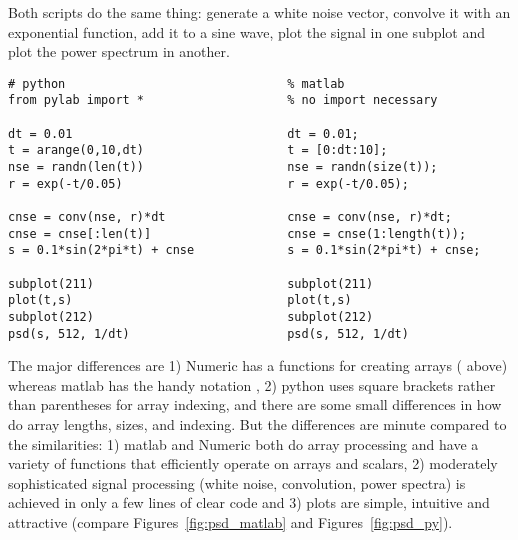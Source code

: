 \documentclass[twoside]{book}
\begin{document}

Both scripts do the same thing: generate a white noise vector,
convolve it with an exponential function, add it to a sine wave, plot
the signal in one subplot and plot the power spectrum in another.

\begin{lstlisting}[caption={matplotlib and matlab}, label=lst:versus_matlab]
# python                               % matlab
from pylab import *                    % no import necessary

dt = 0.01                              dt = 0.01;
t = arange(0,10,dt)                    t = [0:dt:10];
nse = randn(len(t))                    nse = randn(size(t));
r = exp(-t/0.05)                       r = exp(-t/0.05);

cnse = conv(nse, r)*dt                 cnse = conv(nse, r)*dt;
cnse = cnse[:len(t)]                   cnse = cnse(1:length(t));
s = 0.1*sin(2*pi*t) + cnse             s = 0.1*sin(2*pi*t) + cnse;

subplot(211)                           subplot(211)
plot(t,s)                              plot(t,s)
subplot(212)                           subplot(212)
psd(s, 512, 1/dt)                      psd(s, 512, 1/dt)
\end{lstlisting}

The major differences are 1) Numeric has a functions for creating
arrays ( above) whereas matlab has the handy notation
\code{[0:dt:10]}, 2) python uses square brackets rather than
parentheses for array indexing, and there are some small differences
in how do array lengths, sizes, and indexing.  But the differences are
minute compared to the similarities: 1) matlab and Numeric both do
array processing and have a variety of functions that efficiently
operate on arrays and scalars, 2) moderately sophisticated signal
processing (white noise, convolution, power spectra) is achieved in
only a few lines of clear code and 3) plots are simple, intuitive and
attractive (compare  Figures~\ref{fig:psd_matlab} and Figures~\ref{fig:psd_py}).


\end{document}

